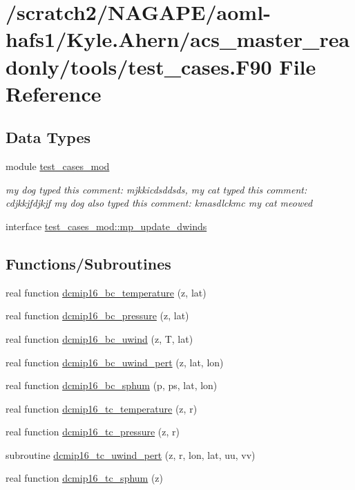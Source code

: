 \section{/scratch2/\-N\-A\-G\-A\-P\-E/aoml-\/hafs1/\-Kyle.Ahern/acs\-\_\-master\-\_\-readonly/tools/test\-\_\-cases.F90 File Reference}
\label{test__cases_8F90}
\subsection*{Data Types}
\begin{DoxyCompactItemize}
\item 
module \hyperlink{classtest__cases__mod}{test\-\_\-cases\-\_\-mod}
\begin{DoxyCompactList}\small\item\em my dog typed this comment\-: mjkkicdsddsds, my cat typed this comment\-: cdjkkjfdjkjf my dog also typed this comment\-: kmasdlckmc my cat meowed \end{DoxyCompactList}\item 
interface \hyperlink{interfacetest__cases__mod_1_1mp__update__dwinds}{test\-\_\-cases\-\_\-mod\-::mp\-\_\-update\-\_\-dwinds}
\end{DoxyCompactItemize}
\subsection*{Functions/\-Subroutines}
\begin{DoxyCompactItemize}
\item 
real function \hyperlink{test__cases_8F90_ad8d7c4f287f00d481441d5ed6548a782}{dcmip16\-\_\-bc\-\_\-temperature} (z, lat)
\item 
real function \hyperlink{test__cases_8F90_a96a22a3e15f1738cc749011d271c5f92}{dcmip16\-\_\-bc\-\_\-pressure} (z, lat)
\item 
real function \hyperlink{test__cases_8F90_adc38b16e967eac3c77a368c4ae19f576}{dcmip16\-\_\-bc\-\_\-uwind} (z, T, lat)
\item 
real function \hyperlink{test__cases_8F90_a3a6b19f475f221bfb89676d08c66f56f}{dcmip16\-\_\-bc\-\_\-uwind\-\_\-pert} (z, lat, lon)
\item 
real function \hyperlink{test__cases_8F90_a65cb29e97873e5d2747fdc1f6c9e9441}{dcmip16\-\_\-bc\-\_\-sphum} (p, ps, lat, lon)
\item 
real function \hyperlink{test__cases_8F90_ad0585e1d1655b321617122bbb0e5a82d}{dcmip16\-\_\-tc\-\_\-temperature} (z, r)
\item 
real function \hyperlink{test__cases_8F90_a5e458c413f97677c92ae272cc37a0fd7}{dcmip16\-\_\-tc\-\_\-pressure} (z, r)
\item 
subroutine \hyperlink{test__cases_8F90_adc8546aa435f0852dd7f705ad64921e6}{dcmip16\-\_\-tc\-\_\-uwind\-\_\-pert} (z, r, lon, lat, uu, vv)
\item 
real function \hyperlink{test__cases_8F90_ac534411a11ff7da77e06dddbc838aeea}{dcmip16\-\_\-tc\-\_\-sphum} (z)
\end{DoxyCompactItemize}


